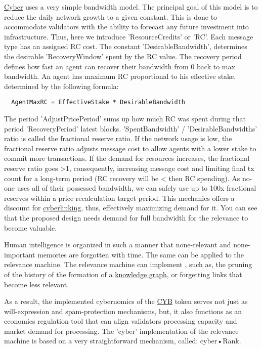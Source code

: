 \documentclass[8pt,oneside]{amsart}
\newcommand{\linkgreen}[2]{\href{#1}{\color{green}{#2}}}
\newcommand{\code}[1]{{\PlayBold #1}}
\begin{document}
{\hyperref[cyber]{Cyber}} uses a very simple bandwidth model. The principal goal of this model is to reduce the daily network growth to a given constant. This is done to accommodate validators with the ability to forecast any future investment into infrastructure. Thus, here we introduce 'ResourceCredits' or 'RC'. Each message type has an assigned RC cost. The constant 'DesirableBandwidth', determines the desirable 'RecoveryWindow' spent by the RC value. The recovery period defines how fast an agent can recover their bandwidth from 0 back to max bandwidth. An agent has maximum RC proportional to his effective stake, determined by the following formula:
\begin{lstlisting}
  AgentMaxRC = EffectiveStake * DesirableBandwidth
\end{lstlisting}

The period 'AdjustPricePeriod' sums up how much RC was spent during that period 'RecoveryPeriod' latest blocks. 'SpentBandwidth' / 'DesirableBandwidths' ratio is called the fractional reserve ratio. If the network usage is low, the fractional reserve ratio adjusts message cost to allow agents with a lower stake to commit more transactions. If the demand for resources increases, the fractional reserve ratio goes \code{>1}, consequently, increasing message cost and limiting final tx count for a long-term period (RC recovery will be \code{<} then RC spending). As no-one uses all of their possessed bandwidth, we can safely use up to 100x fractional reserves within a price recalculation target period. This mechanics offers a discount for {\hyperref[cyberlinks]{cyberlinking}}, thus, effectively maximizing demand for it. You can see that the proposed design needs demand for full bandwidth for the relevance to become valuable.

Human intelligence is organized in such a manner that none-relevant and none-important memories are forgotten with time. The same can be applied to the relevance machine. The relevance machine can implement \linkgreen{https://ipfs.io/ipfs/QmP81EcuNDZHQutvdcDjbQEqiTYUzU315aYaTyrVj6gtJb}{aggressive pruning strategies}, such as, the pruning of the history of the formation of a {\hyperref[knowledge-graph]{knowledge graph}}, or forgetting links that become less relevant.

As a result, the implemented cybernomics of the {\hyperref[cyb]{CYB}} token serves not just as will-expression and spam-protection mechanisms, but, it also functions as an economics regulation tool that can align validators processing capacity and market demand for processing. The 'cyber' implementation of the relevance machine is based on a very straightforward mechanism, called: cyber•Rank.
\end{document}
